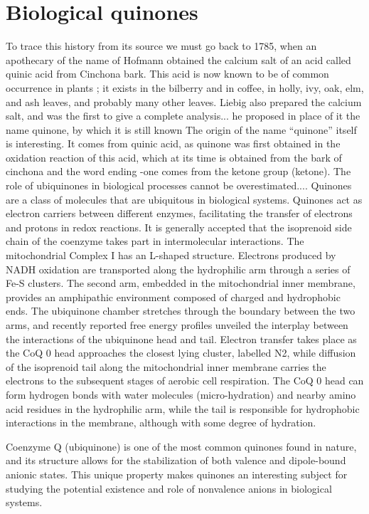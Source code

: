 \section{Biological quinones}
To trace this history from its source we must go back to 1785, when an apothecary of the name of Hofmann obtained the calcium salt of an acid called quinic acid from Cinchona bark. This acid is now known to be of common occurrence in plants ; it exists in the bilberry and in coffee, in holly, ivy, oak, elm, and ash leaves, and probably many other leaves. Liebig also prepared the calcium salt, and was the first to give a complete analysis... he proposed in place of it the name quinone, by which it is still known
The origin of the name “quinone” itself is interesting. It comes from quinic acid, as quinone was first obtained in the oxidation reaction of this acid, which at its time is obtained from the bark of cinchona and the word ending -one comes from the ketone group (ketone)\cite{chen2024low,rusell1873quinone}. 
The role of ubiquinones in biological processes cannot be overestimated...\cite{ernster1995biochemical}.
Quinones are a class of molecules that are ubiquitous in biological systems. Quinones act as electron carriers between different enzymes, facilitating the transfer of electrons and protons in redox reactions. It is generally accepted
that the isoprenoid side chain of the coenzyme takes part in intermolecular interactions. The mitochondrial Complex I has
an L-shaped structure. Electrons produced by NADH oxidation are
transported along the hydrophilic arm through a series of Fe-S
clusters. The second arm, embedded in the mitochondrial inner
membrane, provides an amphipathic environment composed of
charged and hydrophobic ends. The ubiquinone chamber stretches
through the boundary between the two arms, and recently
reported free energy profiles unveiled the interplay between the
interactions of the ubiquinone head and tail. Electron transfer
takes place as the CoQ 0 head approaches the closest lying cluster,
labelled N2, while diffusion of the isoprenoid tail along the mitochondrial inner membrane carries the electrons to the subsequent
stages of aerobic cell respiration. The CoQ 0 head can form hydrogen
bonds with water molecules (micro-hydration) and nearby amino
acid residues in the hydrophilic arm, while the tail is responsible for hydrophobic interactions in the membrane, although with some degree of hydration.

Coenzyme Q (ubiquinone) is one of the most common quinones found in nature, and its structure allows for the stabilization of both valence and dipole-bound anionic states. This unique property makes quinones an interesting subject for studying the potential existence and role of nonvalence anions in biological systems.

